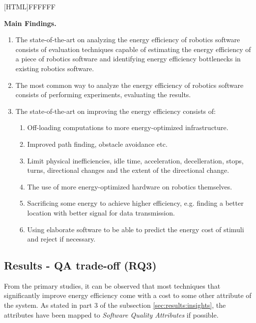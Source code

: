 \noindent{}[HTML]{FFFFFF}{\parbox{0.47\textwidth}{%
\noindent \textbf{Main Findings.}
\begin{enumerate}[nolistsep]
\item The state-of-the-art on analyzing the energy efficiency of robotics software consists of evaluation techniques capable of
estimating the energy efficiency of a piece of robotics software and identifying energy efficiency bottlenecks in existing robotics software.
\item The most common way to analyze the energy efficiency of robotics software consists of performing experiments, evaluating the results.
\item The state-of-the-art on improving the energy efficiency consists of:
    \begin{enumerate}
        \item Off-loading computations to more energy-optimized infrastructure.
        \item Improved path finding, obstacle avoidance etc.
        \item Limit physical inefficiencies, idle time, acceleration, decelleration, stops, turns, directional changes and the extent of the directional change.
        \item The use of more energy-optimized hardware on robotics themselves.
        \item Sacrificing some energy to achieve higher efficiency, e.g. finding a better location with better signal for data transmission.
        \item Using elaborate software to be able to predict the energy cost of stimuli and reject if necessary.
    \end{enumerate}
\end{enumerate}}}


\subsection{Results - QA trade-off (RQ3)}
\label{sec:results:rq3_trade_off}
From the primary studies, it can be observed that most techniques that significantly improve energy efficiency come with a cost to some other attribute of the system.
As stated in part 3 of the subsection \ref{sec:results:insights}, the attributes have been mapped to \textit{Software Quality Attributes\cite{iso2011quality_attributes}}
if possible.

